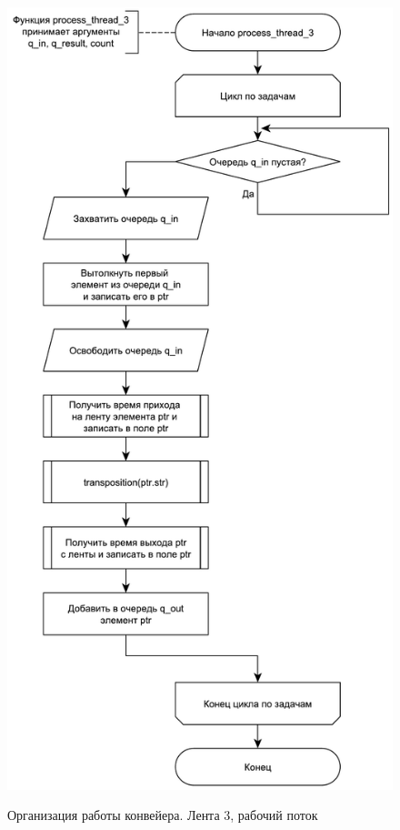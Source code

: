 \newpage

\begin{figure}[pt!]
	\begin{center}
		{\includegraphics[scale = 0.57]{schemes/line_3}}
		\caption{Организация работы конвейера. Лента 3, рабочий поток}
		\label{fig7:image}
	\end{center}
\end{figure}

